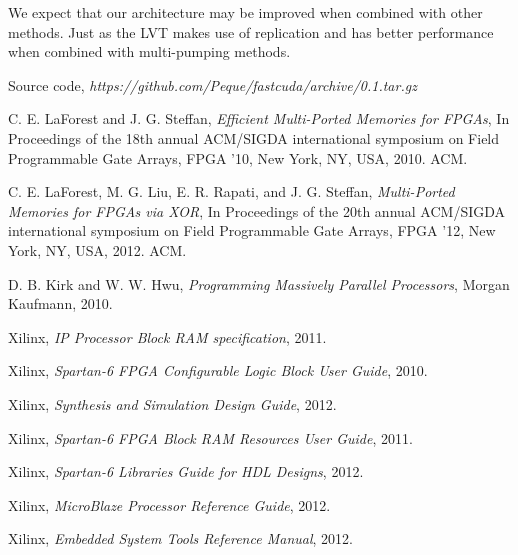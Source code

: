 \documentclass[conference,a4paper]{IEEEtran}
\begin{document}
We expect that our architecture may be improved when combined with other methods. Just as the LVT makes use of replication and has better performance when combined with multi-pumping methods.



\vspace{7pt}
\begin{thebibliography}{1}

Source code,
\emph{https://github.com/Peque/fastcuda/archive/0.1.tar.gz}

C. E. LaForest and J. G. Steffan,
\emph{Efficient Multi-Ported Memories for FPGAs},
In Proceedings of the 18th annual ACM/SIGDA international symposium on Field
Programmable Gate Arrays, FPGA ’10, New York, NY, USA, 2010. ACM.

C. E. LaForest, M. G. Liu, E. R. Rapati, and J. G. Steffan,
\emph{Multi-Ported Memories for FPGAs via XOR},
In Proceedings of the 20th annual ACM/SIGDA international symposium on Field
Programmable Gate Arrays, FPGA '12, New York, NY, USA, 2012. ACM.

D. B. Kirk and W. W. Hwu,
\emph{Programming Massively Parallel Processors},
Morgan Kaufmann, 2010.

Xilinx,
\emph{IP Processor Block RAM specification},
2011.

Xilinx,
\emph{Spartan-6 FPGA Configurable Logic Block User Guide},
2010.

Xilinx,
\emph{Synthesis and Simulation Design Guide},
2012.

Xilinx,
\emph{Spartan-6 FPGA Block RAM Resources User Guide},
2011.

Xilinx,
\emph{Spartan-6 Libraries Guide for HDL Designs},
2012.

Xilinx,
\emph{MicroBlaze Processor Reference Guide},
2012.

Xilinx,
\emph{Embedded System Tools Reference Manual},
2012.

\end{thebibliography}
\end{document}
